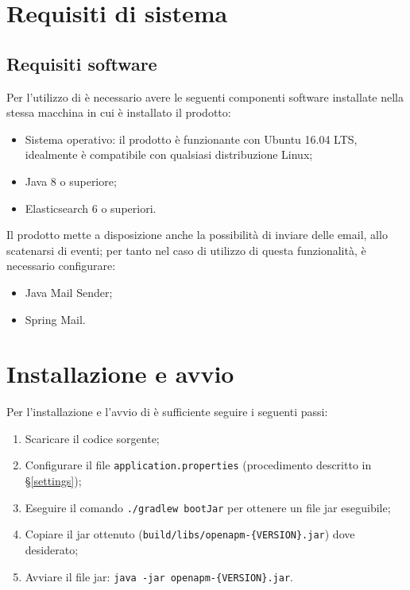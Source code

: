 \section{Requisiti di sistema} \label{requisiti}

	\subsection{Requisiti software}
		
		Per l'utilizzo di \ProjectName{} è necessario avere le seguenti componenti software installate 
		nella stessa macchina in cui è installato il prodotto:	
			
		\begin{itemize}
			\item Sistema operativo: il prodotto è funzionante con Ubuntu 16.04 LTS, idealmente è compatibile con
				qualsiasi distribuzione Linux;
			\item Java 8 o superiore;
			\item Elasticsearch 6 o superiori.
		\end{itemize}
		
		Il prodotto mette a disposizione anche la possibilità di inviare delle email, allo scatenarsi di eventi; per tanto nel caso di utilizzo di questa
		funzionalità, è necessario configurare:

		\begin{itemize}
			\item Java Mail Sender;
			\item Spring Mail.
		\end{itemize}
					
\section{Installazione e avvio} \label{installazione}

	Per l'installazione e l'avvio di \ProjectName{} è sufficiente seguire i seguenti passi:
	\begin{enumerate}
		\item Scaricare il codice sorgente;
		\item Configurare il file \lstinline[columns=fixed]{application.properties} (procedimento descritto in §\ref{settings});
		\item Eseguire il comando \lstinline[columns=fixed]{./gradlew bootJar} per ottenere un file jar eseguibile;
		\item Copiare il jar ottenuto (\verb=build/libs/openapm-{VERSION}.jar=) dove desiderato;
		\item Avviare il file jar: \verb=java -jar openapm-{VERSION}.jar=.
	\end{enumerate}